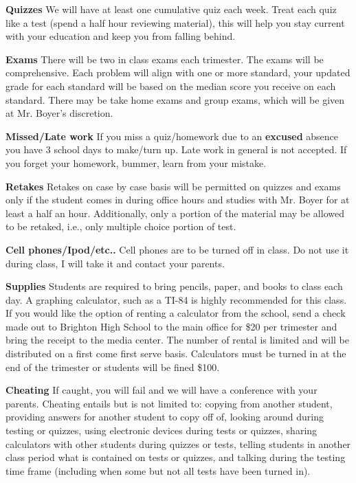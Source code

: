 \documentclass[12pt]{article}
\begin{document}
\textbf{Quizzes} We will have at least one cumulative quiz each week.  Treat each quiz like a test (spend a half hour reviewing material), this will help you stay current with your education and keep you from falling behind. 

\textbf{Exams} There will be two in class exams each trimester.  The exams will be comprehensive.  Each problem will align with one or more standard, your updated grade for each standard will be based on the median score you receive on each standard.  There may be take home exams and group exams, which will be given at Mr. Boyer's discretion.


\textbf{Missed/Late work}  If you miss a quiz/homework due to an \textbf{excused} absence you have 3 school days to make/turn up.  Late work in general is not accepted.  If you forget your homework, bummer, learn from your mistake.

\textbf{Retakes}  Retakes on case by case basis will be permitted on quizzes and exams only if the student comes in during office hours and studies with Mr. Boyer for at least a half an hour.  Additionally, only a portion of the material may be allowed to be retaked, i.e., only multiple choice portion of test.

\textbf{Cell phones/Ipod/etc..}  Cell phones are to be turned off in class.  Do not use it during class, I will take it and contact your parents.

\textbf{Supplies}  Students are required to bring pencils, paper, and books to class each day.  A graphing calculator, such as a TI-84 is highly recommended for this class.  If you would like the option of renting a calculator from the school, send a check made out to Brighton High School to the main office for \$20 per trimester and bring the receipt to the media center.  The number of rental is limited and will be distributed on a first come first serve basis.  Calculators must be turned in at the end of the trimester or students will be fined \$100.

\textbf{Cheating}  If caught, you will fail and we will have a conference with your parents. Cheating entails but is not limited to: copying from another student, providing answers for another student to copy off of, looking around during testing or quizzes, using electronic devices during tests or quizzes, sharing calculators with other students during quizzes or tests, telling students in another class period what is contained on tests or quizzes, and talking during the testing time frame (including when some but not all tests have been turned in).
\end{document}
